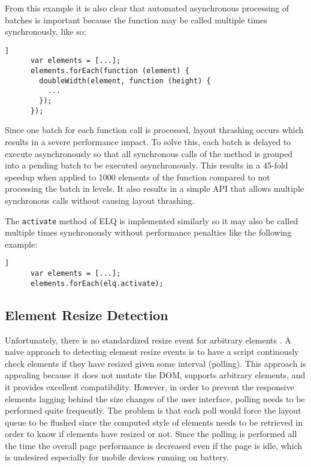 \documentclass{acm_proc_article-sp}
\newcommand{\code}[1]{\texttt{#1}}
\newcommand{\elq}{ELQ}
\newcommand{\gls}[1]{#1}
\begin{document}
    From this example it is also clear that automated asynchronous processing of batches is important because the function may be called multiple times synchronously, like so:

    \begin{lstlisting}[gobble=6,label={},caption={},captionpos=b]]
      var elements = [...];
      elements.forEach(function (element) {
        doubleWidth(element, function (height) {
          ...
        });
      });
    \end{lstlisting}

    Since one batch for each function call is processed, layout thrashing occurs which results in a severe performance impact.
    To solve this, each batch is delayed to execute asynchronously so that all synchronous calls of the method is grouped into a pending batch to be executed asynchronously.
    This results in a 45-fold speedup when applied to 1000 elements of the function compared to not processing the batch in levels.
    It also results in a simple API that allows multiple synchronous calls without causing layout thrashing.

    The \code{activate} method of \elq{} is implemented similarly so it may also be called multiple times synchronously without performance penalties like the following example:

    \begin{lstlisting}[gobble=6,label={},caption={},captionpos=b]]
      var elements = [...];
      elements.forEach(elq.activate);
    \end{lstlisting}
  
  \subsection{Element Resize Detection}\label{sec:imp_erd}
    Unfortunately, there is no standardized resize event for arbitrary elements \cite{w3c_dom2_events}.
    A naive approach to detecting element resize events is to have a script continously check elements if they have resized given some interval (polling).
    This approach is appealing because it does not mutate the \gls{DOM}, supports arbitrary elements, and it provides excellent compatibility.
    However, in order to prevent the \gls{responsive} elements lagging behind the size changes of the user interface, polling needs to be performed quite frequently.
    The problem is that each poll would force the layout queue to be flushed since the computed style of elements needs to be retrieved in order to know if elements have resized or not.
    Since the polling is performed all the time the overall page performance is decreased even if the page is idle, which is undesired especially for mobile devices running on battery.
\end{document}
